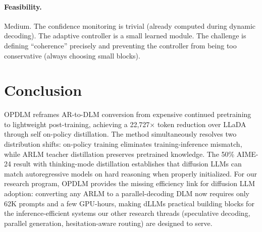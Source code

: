 \documentclass[11pt,a4paper]{article}
\begin{document}
\paragraph{Feasibility.} Medium. The confidence monitoring is trivial (already computed during dynamic decoding). The adaptive controller is a small learned module. The challenge is defining ``coherence'' precisely and preventing the controller from being too conservative (always choosing small blocks).

\section{Conclusion}

OPDLM reframes AR-to-DLM conversion from expensive continued pretraining to lightweight post-training, achieving a 22,727$\times$ token reduction over LLaDA through self on-policy distillation. The method simultaneously resolves two distribution shifts: on-policy training eliminates training-inference mismatch, while ARLM teacher distillation preserves pretrained knowledge. The 50\% AIME-24 result with thinking-mode distillation establishes that diffusion LLMs can match autoregressive models on hard reasoning when properly initialized. For our research program, OPDLM provides the missing efficiency link for diffusion LLM adoption: converting any ARLM to a parallel-decoding DLM now requires only 62K prompts and a few GPU-hours, making dLLMs practical building blocks for the inference-efficient systems our other research threads (speculative decoding, parallel generation, hesitation-aware routing) are designed to serve.
\end{document}

